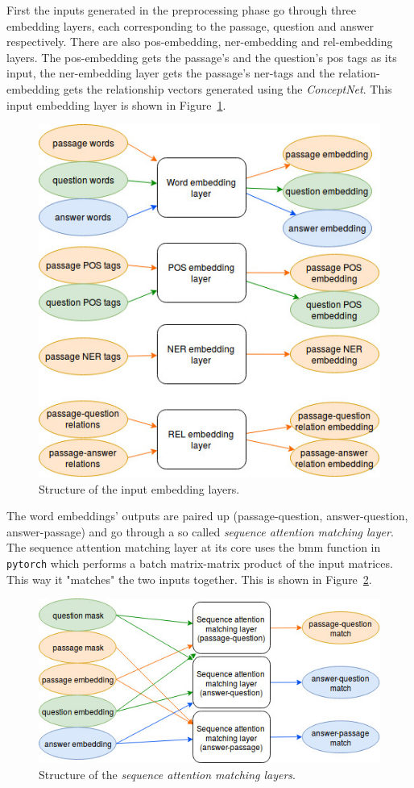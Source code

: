 First the inputs generated in the preprocessing phase go through three embedding layers, each corresponding to the passage, question and answer respectively. There are also pos-embedding, ner-embedding and rel-embedding layers. The pos-embedding gets the passage's and the question's pos tags as its input, the ner-embedding layer gets the passage's ner-tags and the relation-embedding gets the relationship vectors generated using the \textit{ConceptNet}. This input embedding layer is shown in Figure~\ref{fig:embedding}.
\begin{figure}[h!]
	\centering
	\includegraphics[scale=0.5]{TriAN_embeddings.jpg}
	\caption{Structure of the input embedding layers.}
	\label{fig:embedding}
\end{figure}

The word embeddings' outputs are paired up (passage-question, answer-question, answer-passage) and go through a so called \textit{sequence attention matching layer}.
The sequence attention matching layer at its core uses the bmm function in \texttt{pytorch} which performs a batch matrix-matrix product of the input matrices.
This way it "matches" the two inputs together. This is shown in Figure~\ref{fig:attention_match}.
\begin{figure}[h!]
	\centering
	\includegraphics[scale=0.5]{TriAN_attention_match.jpg}
	\caption{Structure of the \textit{sequence attention matching layers}.}
	\label{fig:attention_match}
\end{figure}

